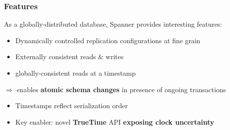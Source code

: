 \documentclass{beamer}
\begin{document}
\begin{frame}
  \frametitle{Features}
  As a globally-distributed database, Spanner provides interesting features:
  \begin{itemize}
    \item{Dynamically controlled replication configurations at fine grain}
    \item{Externally consistent reads \& writes}
    \item{globally-consistent reads at a timestamp}
  \end{itemize}
  $\Rightarrow$ enables \textbf{atomic schema changes} in presence of ongoing
  transactions \newline
  \begin{itemize}
    \item{Timestamps reflect serialization order}
    \item{Key enabler: novel \textbf{TrueTime} API \textbf{exposing clock uncertainty}}
  \end{itemize}
\end{frame}

\end{document}
